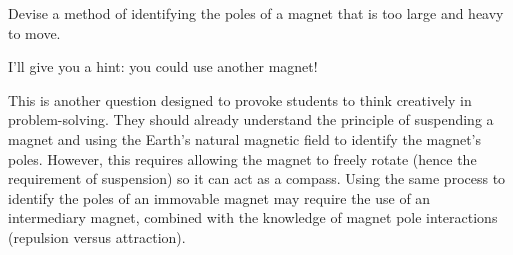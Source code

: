 

Devise a method of identifying the poles of a magnet that is too large and heavy to move.







I'll give you a hint: you could use another magnet!







This is another question designed to provoke students to think creatively in problem-solving.  They should already understand the principle of suspending a magnet and using the Earth's natural magnetic field to identify the magnet's poles.  However, this requires allowing the magnet to freely rotate (hence the requirement of suspension) so it can act as a compass.  Using the same process to identify the poles of an immovable magnet may require the use of an intermediary magnet, combined with the knowledge of magnet pole interactions (repulsion versus attraction).




